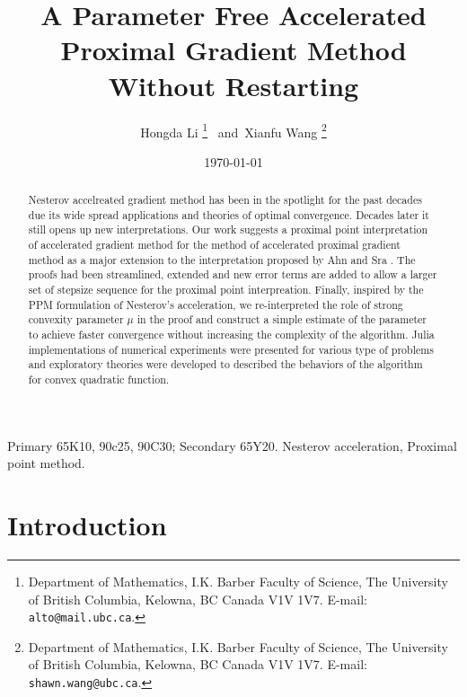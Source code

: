 \documentclass[12pt]{article}
\begin{document}
\title{{\selectfont 
        A Parameter Free Accelerated Proximal Gradient Method Without Restarting
    }}

\author{
    Hongda Li
    \thanks{Department of Mathematics, I.K. Barber Faculty of Science,
    The University of British Columbia, Kelowna, BC Canada V1V 1V7. E-mail:  \texttt{alto@mail.ubc.ca}.}~ and~Xianfu Wang
    \thanks{Department of Mathematics, I.K. Barber Faculty of Science,
    The University of British Columbia, Kelowna, BC Canada V1V 1V7. E-mail:  \texttt{shawn.wang@ubc.ca}.}
}

\date{\today}

\maketitle


\begin{abstract} 
    \noindent
    Nesterov accelreated gradient method has been in the spotlight for the past decades due its wide spread applications and theories of optimal convergence. 
    Decades later it still opens up new interpretations. 
    Our work suggests a proximal point interpretation of accelerated gradient method for the method of accelerated proximal gradient method as a major extension to the interpretation proposed by Ahn and Sra \cite{ahn_understanding_2022}. 
    The proofs had been streamlined, extended and new error terms are added to allow a larger set of stepsize sequence for the proximal point interpreation. 
    Finally, inspired by the PPM formulation of Nesterov's acceleration, we re-interpreted the role of strong convexity parameter $\mu$ in the proof and construct a simple estimate of the parameter to achieve faster convergence without increasing the complexity of the algorithm. 
    Julia \cite{bezanson_julia_2017} implementations of numerical experiments were presented for various type of problems and exploratory theories were developed to described the behaviors of the algorithm for convex quadratic function. 
    
\end{abstract}

Primary 65K10, 90c25, 90C30; Secondary 65Y20. 
 Nesterov acceleration, Proximal point method. 

\section{Introduction}
    
\end{document}
